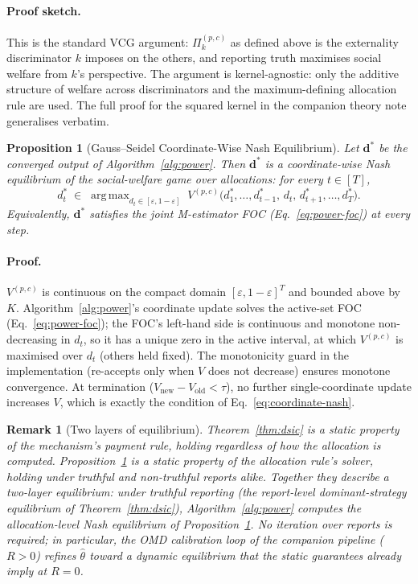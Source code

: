 \documentclass[11pt]{article}
\newtheorem{proposition}[theorem]{Proposition}
\newtheorem{remark}[theorem]{Remark}
\DeclareMathOperator*{\argmax}{arg\,max}
\newcommand{\thetahat}{\hat{\theta}}
\newcommand{\db}{\bm{d}}
\begin{document}
\paragraph{Proof sketch.}
This is the standard VCG argument: $\Pi_k^{(p,c)}$ as defined above is the
externality discriminator $k$ imposes on the others, and reporting truth
maximises social welfare from $k$'s perspective. The argument is
kernel-agnostic: only the additive structure of welfare across discriminators
and the maximum-defining allocation rule are used. The full proof for the
squared kernel in the companion theory note generalises verbatim.

\begin{proposition}[Gauss--Seidel Coordinate-Wise Nash Equilibrium]
\label{prop:gs-nash}
Let $\db^*$ be the converged output of Algorithm~\ref{alg:power}. Then
$\db^*$ is a \emph{coordinate-wise Nash equilibrium} of the social-welfare
game over allocations:
for every $t \in [T]$,
\begin{equation}
d^*_t \;\in\; \argmax_{d_t \in [\varepsilon, 1{-}\varepsilon]}\;
V^{(p, c)}\!\big(d^*_1, \ldots, d^*_{t-1},\, d_t,\, d^*_{t+1}, \ldots, d^*_T\big).
\label{eq:coordinate-nash}
\end{equation}
Equivalently, $\db^*$ satisfies the joint M-estimator FOC
(Eq.~\ref{eq:power-foc}) at every step.
\end{proposition}

\paragraph{Proof.}
$V^{(p,c)}$ is continuous on the compact domain $[\varepsilon, 1-\varepsilon]^T$
and bounded above by $K$. Algorithm~\ref{alg:power}'s coordinate update
solves the active-set FOC (Eq.~\ref{eq:power-foc}); the FOC's left-hand
side is continuous and monotone non-decreasing in $d_t$, so it has a unique
zero in the active interval, at which $V^{(p,c)}$ is maximised over $d_t$
(others held fixed). The monotonicity guard in the implementation
(re-accepts only when $V$ does not decrease) ensures monotone convergence.
At termination ($V_{\text{new}} - V_{\text{old}} < \tau$), no further
single-coordinate update increases $V$, which is exactly the condition
of Eq.~\eqref{eq:coordinate-nash}.

\begin{remark}[Two layers of equilibrium]
Theorem~\ref{thm:dsic} is a \emph{static} property of the mechanism's
payment rule, holding regardless of how the allocation is computed.
Proposition~\ref{prop:gs-nash} is a \emph{static} property of the
allocation rule's solver, holding under truthful and non-truthful reports
alike. Together they describe a \emph{two-layer equilibrium}: under
truthful reporting (the report-level dominant-strategy equilibrium of
Theorem~\ref{thm:dsic}), Algorithm~\ref{alg:power} computes the
allocation-level Nash equilibrium of Proposition~\ref{prop:gs-nash}. No
iteration over reports is required; in particular, the OMD calibration
loop of the companion pipeline ($R > 0$) refines $\thetahat$ toward a
dynamic equilibrium that the static guarantees already imply at $R = 0$.
\end{remark}
\end{document}
